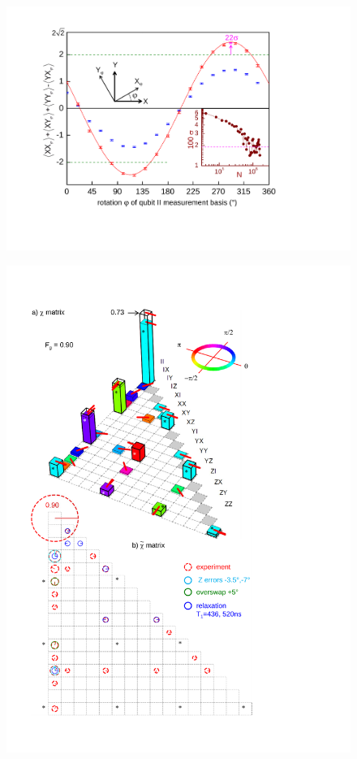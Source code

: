 \begin{figure}
	\centering
		\includegraphics[width=1.\textwidth]{./material/papers/iswap/submission1/Dewes_Figure3}
	\label{fig:iSwap3}
	\caption{}
\end{figure}

\begin{figure}
	\centering
		\includegraphics[width=1.\textwidth]{./material/papers/iswap/submission1/Dewes_Figure4}
	\label{fig:iSwap4}
	\caption{}
\end{figure}
